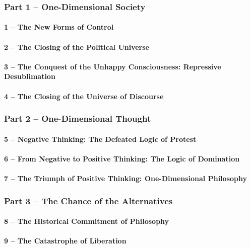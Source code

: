 \documentclass[10pt,titlepage]{book}
\begin{document}
\subsubsection{Part 1 – One-Dimensional Society}
\paragraph{1 – The New Forms of Control}
\paragraph{2 – The Closing of the Political Universe}
\paragraph{3 – The Conquest of the Unhappy Consciousness: Repressive Desublimation}
\paragraph{4 – The Closing of the Universe of Discourse}
\subsubsection{Part 2 – One-Dimensional Thought}
\paragraph{5 – Negative Thinking: The Defeated Logic of Protest}
\paragraph{6 – From Negative to Positive Thinking: The Logic of Domination}
\paragraph{7 – The Triumph of Positive Thinking: One-Dimensional Philosophy}
\subsubsection{Part 3 – The Chance of the Alternatives}
\paragraph{8 – The Historical Commitment of Philosophy}
\paragraph{9 – The Catastrophe of Liberation}
\end{document}
